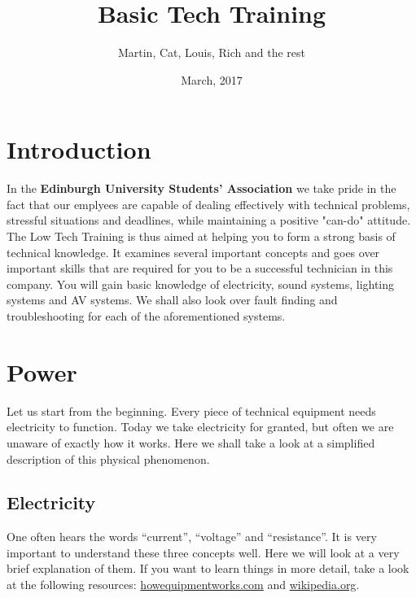 \documentclass[14pt,twocolumn]{extarticle} %
\title{\huge {\textbf{Basic Tech Training}}} %
\author{Martin, Cat, Louis, Rich and the rest}
\date{March, 2017}
\begin{document}

\section{Introduction}
\label{intro}
In the \textbf{Edinburgh University Students' Association} we take pride in the fact that our emplyees are capable of dealing effectively with technical problems, stressful situations and deadlines, while maintaining a positive "can-do" attitude.
The Low Tech Training is thus aimed at helping you to form a strong basis of technical knowledge. It examines several important concepts and goes over important skills that are required for you to be a successful technician in this company. You will gain basic knowledge of electricity, sound systems, lighting systems and AV systems. We shall also look over fault finding and troubleshooting for each of the aforementioned systems.


\section{Power}
\label{power}

Let us start from the beginning. Every piece of technical equipment needs electricity to function. Today we take electricity for granted, but often we are unaware of exactly how it works. Here we shall take a look at a simplified description of this physical phenomenon. 

\subsection{Electricity}
\label{electricity}
One often hears the words “current”, “voltage” and “resistance”. It is very important to understand these three concepts well. Here we will look at a very brief explanation of them. If you want to learn things in more detail, take a look at the following resources: \href{https://www.howequipmentworks.com/electricity_basics/}{howequipmentworks.com} and \href{https://en.wikipedia.org/wiki/Electricity#Electric_charge}{wikipedia.org}.
\end{document}

